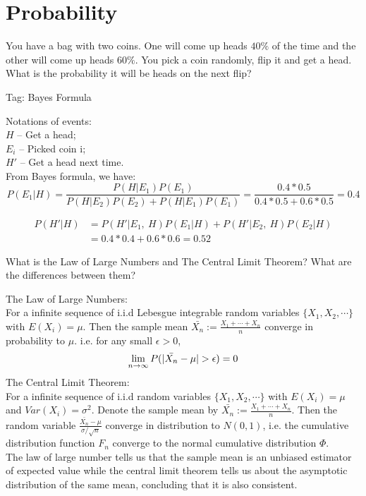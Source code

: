 \chapter{Probability}

\begin{exe}
    You have a bag with two coins. One will come up heads $40\%$ of the time and the other will come up heads $60\%$. You pick a coin randomly, flip it and get a head. What is the probability it will be heads on the next flip?
\end{exe}
\begin{teacher}
Tag: Bayes Formula 
\begin{sol}
Notations of events:\\
$H$ -- Get a head;\\
$E_i$ -- Picked coin i;\\
$H'$ -- Get a head next time.\\
From Bayes formula, we have:
$$P(E_1|H) = \frac{P(H|E_1) P(E_1)} {P(H|E_2) P(E_2) + P(H|E_1) P(E_1)} = \frac{0.4*0.5}{0.4*0.5 + 0.6*0.5}= 0.4$$

\begin{equation*} \label{1}
\begin{split}
P(H'|H) & = P(H'|E_1,\ H)P(E_1|H) + P(H'|E_2,\ H)P(E_2|H) \\
 & = 0.4*0.4 + 0.6*0.6 = 0.52
\end{split}
\end{equation*} 
\end{sol}
\end{teacher}

\begin{exe}
What is the Law of Large Numbers and The Central Limit Theorem? What are the differences between them?
\end{exe}
\begin{teacher}
\begin{sol}
The Law of Large Numbers:\\
For a infinite sequence of i.i.d Lebesgue integrable random variables $\{X_1, X_2, \cdots\}$ with $E(X_i) = \mu$. Then the sample mean $\bar{X_n} := \frac{X_1+\cdots+X_n}{n}$ converge in probability to $\mu$. i.e. for any small $\epsilon>0$, 
$$\lim_{n\rightarrow \infty} P(|\Bar{X_n}-\mu| >\epsilon) = 0$$
The Central Limit Theorem:\\
For a infinite sequence of i.i.d random variables $\{X_1, X_2, \cdots\}$ with $E(X_i) = \mu$ and $Var(X_i) = \sigma^2$. Denote the sample mean by $\bar{X_n} := \frac{X_1+\cdots+X_n}{n}$. Then the random variable $\frac{\bar{X_n} - \mu}{\sigma/\sqrt{n}}$ converge in distribution to $N(0, 1)$, i.e. the cumulative distribution function $F_n$ converge to the normal cumulative distribution $\Phi$.\\
The law of large number tells us that the sample mean is an unbiased estimator of expected value while the central limit theorem tells us about the asymptotic distribution of the same mean, concluding that it is also consistent. 
\end{sol}
\end{teacher}

